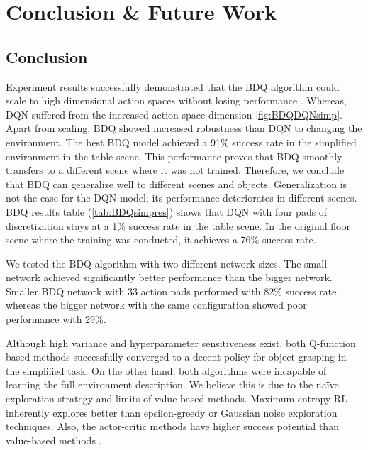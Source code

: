 
\chapter{Conclusion \& Future Work}\label{chapter:conclusion}

\section{Conclusion}


Experiment results successfully demonstrated that the BDQ algorithm could scale to high dimensional action spaces without losing performance \cite{Tavakoli2018}. Whereas, DQN suffered from the increased action space dimension \ref{fig:BDQDQNsimp}. Apart from scaling, BDQ showed increased robustness than DQN to changing the environment. The best BDQ model achieved a 91\% success rate in the simplified environment in the table scene. This performance proves that BDQ smoothly transfers to a different scene where it was not trained. Therefore, we conclude that BDQ can generalize well to different scenes and objects. Generalization is not the case for the DQN model; its performance deteriorates in different scenes. BDQ results table (\ref{tab:BDQsimpres}) shows that DQN with four pads of discretization stays at a 1\% success rate in the table scene. In the original floor scene where the training was conducted, it achieves a 76\% success rate.

We tested the BDQ algorithm with two different network sizes. The small network achieved significantly better performance than the bigger network. Smaller BDQ network with 33 action pads performed with 82\% success rate, whereas the bigger network with the same configuration showed poor performance with 29\%.

Although high variance and hyperparameter sensitiveness exist, both Q-function based methods successfully converged to a decent policy for object grasping in the simplified task. On the other hand, both algorithms were incapable of learning the full environment description. We believe this is due to the naïve exploration strategy and limits of value-based methods. Maximum entropy RL inherently explores better than epsilon-greedy or Gaussian noise exploration techniques. Also, the actor-critic methods have higher success potential than value-based methods \cite{Lillicrap2016}. 

